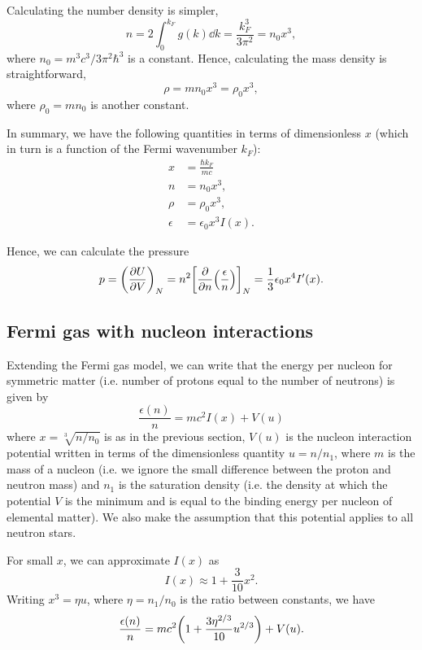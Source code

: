\documentclass[draft,11pt]{article}
\theoremstyle{definition}
\theoremstyle{remark}
\begin{document}
            Calculating the number density is simpler, \[n=2\int_{0}^{k_{F}}g(k)\dd{k}=\frac{k_{F}^{3}}{3\pi^{2}}=n_{0}x^{3},\] where $n_{0}=m^{3}c^{3}/3\pi^{2}\hbar^{3}$ is a constant. Hence, calculating the mass density is straightforward, \[\rho=mn_{0}x^{3}=\rho_{0}x^{3},\] where $\rho_{0}=mn_{0}$ is another constant.
            
            In summary, we have the following quantities in terms of dimensionless $x$ (which in turn is a function of the Fermi wavenumber $k_{F}$):
                \begin{align}
                    x&=\frac{\hbar k_{F}}{mc}\\
                    n&=n_{0}x^{3},\\
                    \label{eq/fermi/mass.density}\rho&=\rho_{0}x^{3},\\
                    \label{eq/fermi/energy.density}\epsilon&=\epsilon_{0}x^{3}I(x).
                \end{align}
                
            Hence, we can calculate the pressure \begin{equation}\label{eq/fermi/pressure}p=\qty(\pdv{U}{V})_{N}=n^{2}\qty[\pdv{n}(\frac{\epsilon}{n})]_{N}=\frac{1}{3}\epsilon_{0}x^{4}I'(x).\end{equation}

        
        \subsection{Fermi gas with nucleon interactions}
            Extending the Fermi gas model, we can write that the energy per nucleon for symmetric matter (i.e. number of protons equal to the number of neutrons) is given by \parencite{silbar.reddy.2004/neutron.stars} \[\frac{\epsilon(n)}{n}=mc^{2}I(x)+V(u)\] where $x=\sqrt[3]{n/n_{0}}$ is as in the previous section, $V(u)$ is the nucleon interaction potential written in terms of the dimensionless quantity $u=n/n_{1}$, where $m$ is the mass of a nucleon (i.e. we ignore the small difference between the proton and neutron mass) and $n_{1}$ is the saturation density (i.e. the density at which the potential $V$ is the minimum and is equal to the binding energy per nucleon of elemental matter). We also make the assumption that this potential applies to all neutron stars. %
            
            For small $x$, we can approximate $I(x)$ as \[I(x)\approx1+\frac{3}{10}x^{2}.\] Writing $x^{3}=\eta u$, where $\eta=n_{1}/n_{0}$ is the ratio between constants, we have \begin{equation}\label{eq/symmetric.energy}\frac{\epsilon(n)}{n}=mc^{2}\qty(1+\frac{3\eta^{2/3}}{10}u^{2/3})+V(u).\end{equation} %
            
\end{document}
